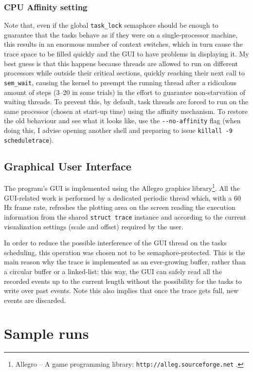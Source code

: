 \documentclass[paper=a4, fontsize=11pt]{scrartcl}
\newcommand{\mono}[1]{\texttt{#1}}
\numberwithin{equation}{section}        %
\numberwithin{figure}{section}          %
\numberwithin{table}{section}               %
\numberwithin{fragment}{section}
\begin{document}
\subsubsection{CPU Affinity setting}\label{sec:tasks:affinity}
Note that, even if the global \mono{task\_lock} semaphore should be enough to guarantee that the tasks behave as if they were on a single-processor machine, this results in an enormous number of context switches, which in turn cause the trace space to be filled quickly and the GUI to have problems in displaying it.
My best guess is that this happens because threads are allowed to run on different processors while outside their critical sections, quickly reaching their next call to \mono{sem\_wait}, causing the kernel to preempt the running thread after a ridiculous amount of steps (3--20 in some trials) in the effort to guarantee non-starvation of waiting threads. To prevent this, by default, task threads are forced to run on the same processor (chosen at start-up time) using the affinity mechanism\cite{man-pthread-affinity}\cite{man-affinity}.
To restore the old behaviour and see what it looks like, use the \mono{-{}-no-affinity} flag (when doing this, I advise opening another shell and preparing to issue \mono{killall -9 scheduletrace}).


\subsection{Graphical User Interface}\label{sec:gui}
The program's GUI is implemented using the Allegro graphics library\footnote{Allegro -- A game programming library: \mono{http://alleg.sourceforge.net} .}.
All the GUI-related work is performed by a dedicated periodic thread which, with a 60 Hz frame rate, refreshes the plotting area on the screen reading the execution information from the shared \mono{struct trace} instance and according to the current visualization settings (scale and offset) required by the user.

In order to reduce the possible interference of the GUI thread on the tasks scheduling, this operation was chosen not to be semaphore-protected. This is the main reason why the trace is implemented as an ever-growing buffer, rather than a circular buffer or a linked-list: this way, the GUI can safely read all the recorded events up to the current length without the possibility for the tasks to write over past events. Note this also implies that once the trace gets full, new events are discarded.


\section{Sample runs}\label{sec:runs}
\end{document}
